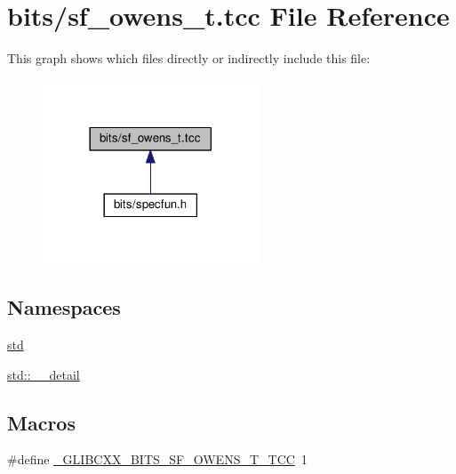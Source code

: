 \hypertarget{sf__owens__t_8tcc}{}\section{bits/sf\+\_\+owens\+\_\+t.tcc File Reference}
\label{sf__owens__t_8tcc}
This graph shows which files directly or indirectly include this file\+:
\nopagebreak
\begin{figure}[H]
\begin{center}
\leavevmode
\includegraphics[width=182pt]{sf__owens__t_8tcc__dep__incl}
\end{center}
\end{figure}
\subsection*{Namespaces}
\begin{DoxyCompactItemize}
\item 
 \hyperlink{namespacestd}{std}
\item 
 \hyperlink{namespacestd_1_1____detail}{std\+::\+\_\+\+\_\+detail}
\end{DoxyCompactItemize}
\subsection*{Macros}
\begin{DoxyCompactItemize}
\item 
\#define \hyperlink{sf__owens__t_8tcc_a5986cbb2c459a5e859ffe2fe1fa7cd25}{\+\_\+\+G\+L\+I\+B\+C\+X\+X\+\_\+\+B\+I\+T\+S\+\_\+\+S\+F\+\_\+\+O\+W\+E\+N\+S\+\_\+\+T\+\_\+\+T\+CC}~1
\end{DoxyCompactItemize}
